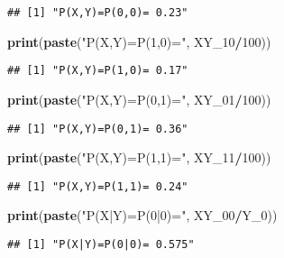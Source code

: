 \documentclass[]{article}
\newenvironment{Shaded}{\begin{snugshade}}{\end{snugshade}}
\newcommand{\KeywordTok}[1]{\textcolor[rgb]{0.13,0.29,0.53}{\textbf{#1}}}
\newcommand{\DecValTok}[1]{\textcolor[rgb]{0.00,0.00,0.81}{#1}}
\newcommand{\StringTok}[1]{\textcolor[rgb]{0.31,0.60,0.02}{#1}}
\newcommand{\OperatorTok}[1]{\textcolor[rgb]{0.81,0.36,0.00}{\textbf{#1}}}
\newcommand{\NormalTok}[1]{#1}
\begin{document}
\begin{verbatim}
## [1] "P(X,Y)=P(0,0)= 0.23"
\end{verbatim}

\begin{Shaded}
\begin{Highlighting}[]
\KeywordTok{print}\NormalTok{(}\KeywordTok{paste}\NormalTok{(}\StringTok{"P(X,Y)=P(1,0)="}\NormalTok{, XY_}\DecValTok{10}\OperatorTok{/}\DecValTok{100}\NormalTok{))}
\end{Highlighting}
\end{Shaded}

\begin{verbatim}
## [1] "P(X,Y)=P(1,0)= 0.17"
\end{verbatim}

\begin{Shaded}
\begin{Highlighting}[]
\KeywordTok{print}\NormalTok{(}\KeywordTok{paste}\NormalTok{(}\StringTok{"P(X,Y)=P(0,1)="}\NormalTok{, XY_}\DecValTok{01}\OperatorTok{/}\DecValTok{100}\NormalTok{))}
\end{Highlighting}
\end{Shaded}

\begin{verbatim}
## [1] "P(X,Y)=P(0,1)= 0.36"
\end{verbatim}

\begin{Shaded}
\begin{Highlighting}[]
\KeywordTok{print}\NormalTok{(}\KeywordTok{paste}\NormalTok{(}\StringTok{"P(X,Y)=P(1,1)="}\NormalTok{, XY_}\DecValTok{11}\OperatorTok{/}\DecValTok{100}\NormalTok{))}
\end{Highlighting}
\end{Shaded}

\begin{verbatim}
## [1] "P(X,Y)=P(1,1)= 0.24"
\end{verbatim}

\begin{Shaded}
\begin{Highlighting}[]
\KeywordTok{print}\NormalTok{(}\KeywordTok{paste}\NormalTok{(}\StringTok{"P(X|Y)=P(0|0)="}\NormalTok{, XY_}\DecValTok{00}\OperatorTok{/}\NormalTok{Y_}\DecValTok{0}\NormalTok{))}
\end{Highlighting}
\end{Shaded}

\begin{verbatim}
## [1] "P(X|Y)=P(0|0)= 0.575"
\end{verbatim}
\end{document}

